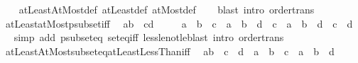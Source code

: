 \begin{isabellebody}
%
\isadelimproof
\ \ %
\endisadelimproof
%
\isatagproof
{}\isamarkupfalse%
\ atLeastAtMost{\isacharunderscore}{\kern0pt}def\ atLeast{\isacharunderscore}{\kern0pt}def\ atMost{\isacharunderscore}{\kern0pt}def\isanewline
\ \ \isamarkupfalse%
\ {\isacharparenleft}{\kern0pt}blast\ intro{\isacharcolon}{\kern0pt}\ order{\isacharunderscore}{\kern0pt}trans{\isacharparenright}{\kern0pt}%
\endisatagproof
{\isafoldproof}%
%
\isadelimproof
\isanewline
%
\endisadelimproof
\isanewline
{}\isamarkupfalse%
\ atLeastatMost{\isacharunderscore}{\kern0pt}psubset{\isacharunderscore}{\kern0pt}iff{\isacharcolon}{\kern0pt}\isanewline
\ \ {\isachardoublequoteopen}{\isacharbraceleft}{\kern0pt}a{\isachardot}{\kern0pt}{\isachardot}{\kern0pt}b{\isacharbraceright}{\kern0pt}\ {\isacharless}{\kern0pt}\ {\isacharbraceleft}{\kern0pt}c{\isachardot}{\kern0pt}{\isachardot}{\kern0pt}d{\isacharbraceright}{\kern0pt}\ {\isasymlongleftrightarrow}\isanewline
\ \ \ {\isacharparenleft}{\kern0pt}{\isacharparenleft}{\kern0pt}{\isasymnot}\ a\ {\isasymle}\ b{\isacharparenright}{\kern0pt}\ {\isasymor}\ c\ {\isasymle}\ a\ {\isasymand}\ b\ {\isasymle}\ d\ {\isasymand}\ {\isacharparenleft}{\kern0pt}c\ {\isacharless}{\kern0pt}\ a\ {\isasymor}\ b\ {\isacharless}{\kern0pt}\ d{\isacharparenright}{\kern0pt}{\isacharparenright}{\kern0pt}\ {\isasymand}\ c\ {\isasymle}\ d{\isachardoublequoteclose}\isanewline
%
\isadelimproof
\ \ %
\endisadelimproof
%
\isatagproof
{}\isamarkupfalse%
{\isacharparenleft}{\kern0pt}simp\ add{\isacharcolon}{\kern0pt}\ psubset{\isacharunderscore}{\kern0pt}eq\ set{\isacharunderscore}{\kern0pt}eq{\isacharunderscore}{\kern0pt}iff\ less{\isacharunderscore}{\kern0pt}le{\isacharunderscore}{\kern0pt}not{\isacharunderscore}{\kern0pt}le{\isacharparenright}{\kern0pt}{\isacharparenleft}{\kern0pt}blast\ intro{\isacharcolon}{\kern0pt}\ order{\isacharunderscore}{\kern0pt}trans{\isacharparenright}{\kern0pt}%
\endisatagproof
{\isafoldproof}%
%
\isadelimproof
\isanewline
%
\endisadelimproof
\isanewline
{}\isamarkupfalse%
\ atLeastAtMost{\isacharunderscore}{\kern0pt}subseteq{\isacharunderscore}{\kern0pt}atLeastLessThan{\isacharunderscore}{\kern0pt}iff{\isacharcolon}{\kern0pt}\isanewline
\ \ {\isachardoublequoteopen}{\isacharbraceleft}{\kern0pt}a{\isachardot}{\kern0pt}{\isachardot}{\kern0pt}b{\isacharbraceright}{\kern0pt}\ {\isasymsubseteq}\ {\isacharbraceleft}{\kern0pt}c\ {\isachardot}{\kern0pt}{\isachardot}{\kern0pt}{\isacharless}{\kern0pt}\ d{\isacharbraceright}{\kern0pt}\ {\isasymlongleftrightarrow}\ {\isacharparenleft}{\kern0pt}a\ {\isasymle}\ b\ {\isasymlongrightarrow}\ c\ {\isasymle}\ a\ {\isasymand}\ b\ {\isacharless}{\kern0pt}\ d{\isacharparenright}{\kern0pt}{\isachardoublequoteclose}\ \isanewline

\end{isabellebody}
